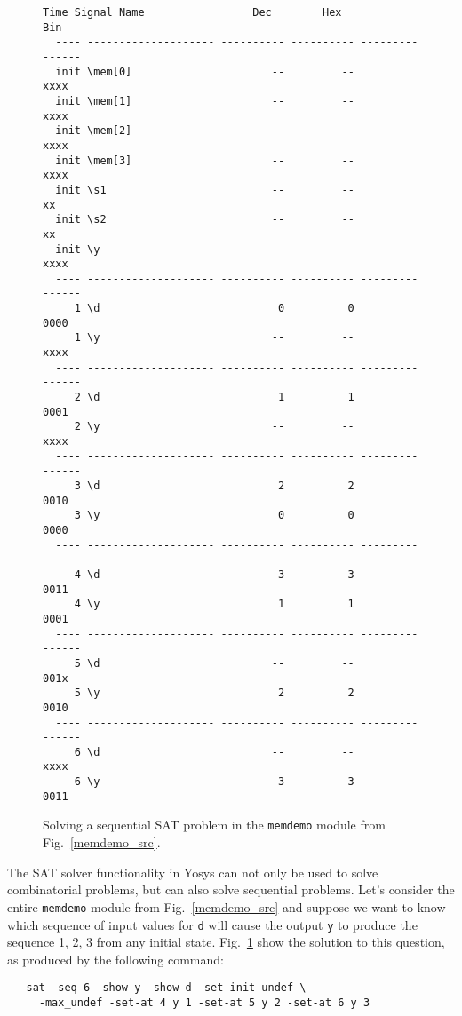 \documentclass[9pt,technote,a4paper]{IEEEtran}
\begin{document}
\begin{figure}[t!]
\begin{lstlisting}[basicstyle=\ttfamily\scriptsize]
  Time Signal Name                 Dec        Hex             Bin
  ---- -------------------- ---------- ---------- ---------------
  init \mem[0]                      --         --            xxxx
  init \mem[1]                      --         --            xxxx
  init \mem[2]                      --         --            xxxx
  init \mem[3]                      --         --            xxxx
  init \s1                          --         --              xx
  init \s2                          --         --              xx
  init \y                           --         --            xxxx
  ---- -------------------- ---------- ---------- ---------------
     1 \d                            0          0            0000
     1 \y                           --         --            xxxx
  ---- -------------------- ---------- ---------- ---------------
     2 \d                            1          1            0001
     2 \y                           --         --            xxxx
  ---- -------------------- ---------- ---------- ---------------
     3 \d                            2          2            0010
     3 \y                            0          0            0000
  ---- -------------------- ---------- ---------- ---------------
     4 \d                            3          3            0011
     4 \y                            1          1            0001
  ---- -------------------- ---------- ---------- ---------------
     5 \d                           --         --            001x
     5 \y                            2          2            0010
  ---- -------------------- ---------- ---------- ---------------
     6 \d                           --         --            xxxx
     6 \y                            3          3            0011
\end{lstlisting}
\caption{Solving a sequential SAT problem in the {\tt memdemo} module from Fig.~\ref{memdemo_src}.}
\label{memdemo_sat}
\end{figure}

The SAT solver functionality in Yosys can not only be used to solve
combinatorial problems, but can also solve sequential problems. Let's consider
the entire {\tt memdemo} module from Fig.~\ref{memdemo_src} and suppose we
want to know which sequence of input values for {\tt d} will cause the output
{\tt y} to produce the sequence 1, 2, 3 from any initial state.
Fig.~\ref{memdemo_sat} show the solution to this question, as produced by
the following command:

\begin{verbatim}
   sat -seq 6 -show y -show d -set-init-undef \
     -max_undef -set-at 4 y 1 -set-at 5 y 2 -set-at 6 y 3
\end{verbatim}
\end{document}
